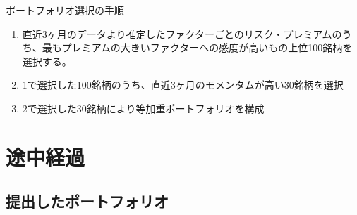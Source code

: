 \documentclass[11pt]{jreport}
\begin{document}
\begin{itembox}[l]{ポートフォリオ選択の手順}
\begin{enumerate}
\item 直近3ヶ月のデータより推定したファクターごとのリスク・プレミアムのうち、最もプレミアムの大きいファクターへの感度が高いもの上位100銘柄を選択する。
\item 1で選択した100銘柄のうち、直近3ヶ月のモメンタムが高い30銘柄を選択
\item 2で選択した30銘柄により等加重ポートフォリオを構成
\end{enumerate}
\end{itembox}

\chapter{途中経過}
\section{提出したポートフォリオ}
\end{document}

